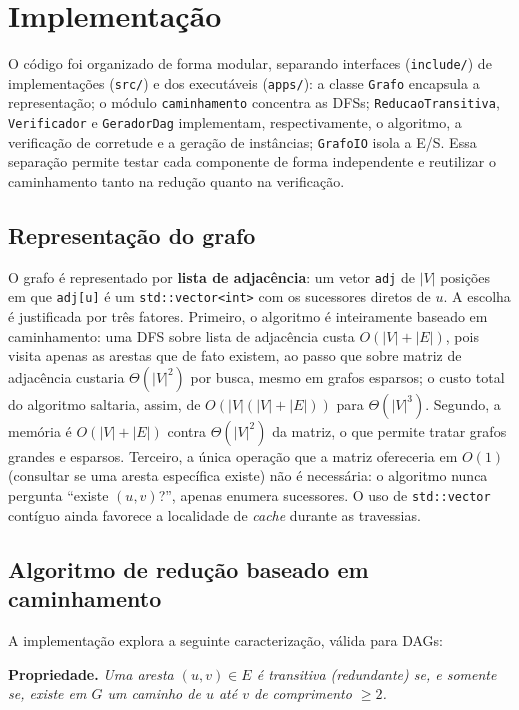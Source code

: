 \documentclass[10pt,twocolumn]{article}
\begin{document}
\section{Implementação}
\label{sec:impl}

O código foi organizado de forma modular, separando interfaces (\texttt{include/}) de implementações (\texttt{src/}) e dos executáveis (\texttt{apps/}): a classe \texttt{Grafo} encapsula a representação; o módulo \texttt{caminhamento} concentra as DFSs; \texttt{ReducaoTransitiva}, \texttt{Verificador} e \texttt{GeradorDag} implementam, respectivamente, o algoritmo, a verificação de corretude e a geração de instâncias; \texttt{GrafoIO} isola a E/S. Essa separação permite testar cada componente de forma independente e reutilizar o caminhamento tanto na redução quanto na verificação.

\subsection{Representação do grafo}
\label{sec:repr}

O grafo é representado por \textbf{lista de adjacência}: um vetor \texttt{adj} de $|V|$ posições em que \texttt{adj[u]} é um \texttt{std::vector<int>} com os sucessores diretos de $u$. A escolha é justificada por três fatores. Primeiro, o algoritmo é inteiramente baseado em caminhamento: uma DFS sobre lista de adjacência custa $O(|V|+|E|)$, pois visita apenas as arestas que de fato existem, ao passo que sobre matriz de adjacência custaria $\Theta(|V|^2)$ por busca, mesmo em grafos esparsos; o custo total do algoritmo saltaria, assim, de $O(|V|(|V|+|E|))$ para $\Theta(|V|^3)$. Segundo, a memória é $O(|V|+|E|)$ contra $\Theta(|V|^2)$ da matriz, o que permite tratar grafos grandes e esparsos. Terceiro, a única operação que a matriz ofereceria em $O(1)$ (consultar se uma aresta específica existe) não é necessária: o algoritmo nunca pergunta ``existe $(u,v)$?'', apenas enumera sucessores. O uso de \texttt{std::vector} contíguo ainda favorece a localidade de \emph{cache} durante as travessias.

\subsection{Algoritmo de redução baseado em caminhamento}
\label{sec:alg}

A implementação explora a seguinte caracterização, válida para DAGs:

\medskip
\noindent\textbf{Propriedade.} \emph{Uma aresta $(u,v) \in E$ é transitiva (redundante) se, e somente se, existe em $G$ um caminho de $u$ até $v$ de comprimento $\geq 2$.}
\medskip
\end{document}
